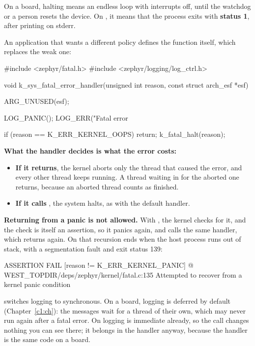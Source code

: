\noindent On a board, halting means an endless loop with interrupts off, until the watchdog or a
person resets the device. On , it means that the process exits with \textbf{status
1}, after printing  on stderr.

An application that wants a different policy defines the function itself, which replaces the weak
one:

\begin{ccode}
#include <zephyr/fatal.h>
#include <zephyr/logging/log_ctrl.h>

void k_sys_fatal_error_handler(unsigned int reason, const struct arch_esf *esf)
{
	ARG_UNUSED(esf);

	LOG_PANIC();
	LOG_ERR("Fatal error %

	if (reason == K_ERR_KERNEL_OOPS) {
		return;
	}
	k_fatal_halt(reason);
}
\end{ccode}

\noindent \textbf{What the handler decides is what the error costs:}

\begin{itemize}
  \item \textbf{If it returns}, the kernel aborts only the thread that caused the error, and every other
    thread keeps running. A thread waiting in  for the aborted one returns,
    because an aborted thread counts as finished.
  \item \textbf{If it calls }, the system halts, as with the default handler.
\end{itemize}

\textbf{Returning from a panic is not allowed.} With , the kernel checks for
it, and the check is itself an assertion, so it panics again, and calls the same handler, which
returns again. On  that recursion ends when the host process runs out of stack,
with a segmentation fault and exit status 139:

\begin{console}
ASSERTION FAIL [reason != K_ERR_KERNEL_PANIC] @ WEST_TOPDIR/deps/zephyr/kernel/fatal.c:135
	Attempted to recover from a kernel panic condition
\end{console}

\noindent {} switches logging to synchronous. On a board, logging is deferred by
default (Chapter~\ref{c1:ch}): the messages wait for a thread of their own, which may never run
again after a fatal error. On  logging is immediate already, so the call changes
nothing you can see there; it belongs in the handler anyway, because the handler is the same code on
a board.

